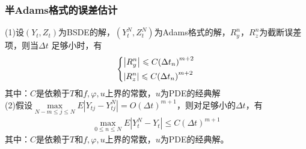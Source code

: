 		\subsubsection{半Adams格式的误差估计}
			\noindent (1)设$(Y_t,Z_t)$为BSDE的解，$(Y_t^N,Z_t^N)$为Adams格式的解，$R_y^n$，$R_z^n$为截断误差项，则当$\Delta  t$ 足够小时，有
							\begin{equation*}
						\centering
						\left\{\begin{lgathered}
						{\left| {R_y^{n}} \right| \leqslant C{{\left( {\Delta {t_n}} \right)}^{m+2}}}\\
						{\left| {R_z^{n}} \right| \leqslant C{{\left( {\Delta {t_n}} \right)}^{m+2}}}
							\end{lgathered} \right.
							\end{equation*}
			 其中：$C$是依赖于$T$和$f,\varphi,u$上界的常数，$u$为PDE的经典解\\%
			 \noindent (2)假设$\mathop {\max }\limits_{N - m \leqslant j \leqslant N} E\left| {{Y_{tj}} - Y_{tj}^N} \right| =O{\left( {\Delta t} \right)^{m + 1}}$，则对足够小的$\Delta t$，有
			\begin{align*}
			\mathop {\max }\limits_{0 \leqslant n \leqslant N} E\left| {{Y_{t}^N} - Y_{t}} \right|  \leqslant C{\left( {\Delta t} \right)^{m + 1}}\end{align*}
			 其中：$C$是依赖于$T$和$f,\varphi,u$上界的常数，$u$为PDE的经典解。
